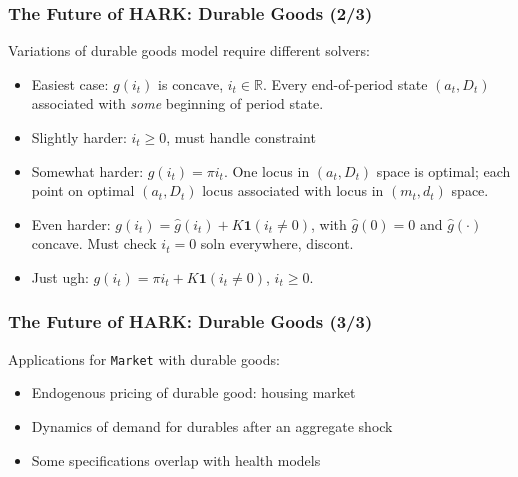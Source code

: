 \documentclass[11ptt]{beamer}
\newcommand{\R}{\mathbb{R}}
\newcommand{\bi}{\begin{itemize}}
\newcommand{\ei}{\end{itemize}}
\begin{document}
\begin{frame}
\frametitle{The Future of HARK: Durable Goods (2/3)}
Variations of durable goods model require different solvers:
\bi
\item <1-> Easiest case: $g(i_t)$ is concave, $i_t \in \R$.  Every end-of-period state $(a_t,D_t)$ associated with \textit{some} beginning of period state.

\item <1->Slightly harder: $i_t \geq 0$, must handle constraint

\item <2->Somewhat harder: $g(i_t) = \pi i_t$.  One locus in $(a_t,D_t)$ space is optimal; each point on optimal $(a_t,D_t)$ locus associated with locus in $(m_t,d_t)$ space.

\item <3->Even harder: $g(i_t) = \widehat{g}(i_t) + K \mathbf{1}(i_t \neq 0)$, with $\widehat{g}(0) = 0$ and $\widehat{g}(\cdot)$ concave.  Must check $i_t=0$ soln everywhere, discont.

\item <4->Just ugh: $g(i_t) = \pi i_t +K \mathbf{1}(i_t \neq 0)$, $i_t \geq 0$.
\ei
\end{frame}


\begin{frame}
\frametitle{The Future of HARK: Durable Goods (3/3)}
Applications for \texttt{Market} with durable goods:
\bi
\item Endogenous pricing of durable good: housing market

\item Dynamics of demand for durables after an aggregate shock

\item Some specifications overlap with health models
\ei

\hyperlink{DiscussionTopics}{}
\end{frame}


\end{document}
